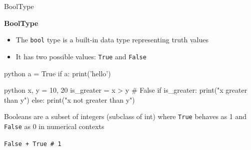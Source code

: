 \documentclass[
	11pt, 
]{beamer}
\begin{document}
\begin{frame}[fragile]{BoolType} %

\textbf{BoolType}
\vspace{.2cm}
\begin{itemize}
    \item The \texttt{bool} type is a built-in data type representing truth values
    \item It has two possible values: \texttt{True} and \texttt{False}
\end{itemize}

\begin{minipage}[t]{0.39\textwidth}
\begin{mintedbox}{python}
a = True
if a:
    print('hello')
\end{mintedbox}
\end{minipage}
\hfill
\begin{minipage}[t]{0.60\textwidth}
\begin{mintedbox}{python}
x, y = 10, 20
is_greater = x > y   # False
if is_greater:
    print("x greater than y")
else:
    print("x not greater than y")
\end{mintedbox}
\end{minipage}

\vspace{.3cm}

Booleans are a subset of integers (subclass of int) where \texttt{True} behaves as 1 and \texttt{False} as 0 in numerical contexts

\centering
\vspace{.4cm}
\texttt{False + True \# 1}

\end{frame}

\end{document}
